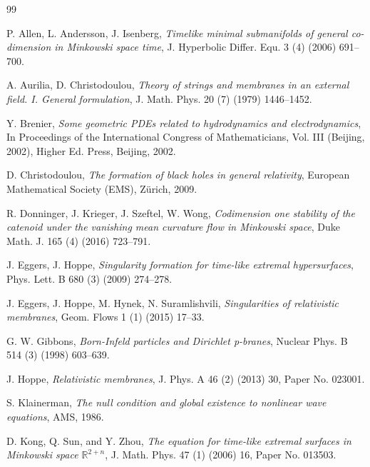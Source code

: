 \documentclass[10pt,leqno]{amsart}
\numberwithin{equation}{section}
\begin{document}
\begin{thebibliography}{99}

  P. Allen, L. Andersson, J. Isenberg, \textit{Timelike minimal submanifolds of general co-dimension in Minkowski space time},
  J. Hyperbolic Differ. Equ. 3 (4) (2006) 691–700.
  
A. Aurilia, D. Christodoulou, \textit{Theory of strings and membranes in an external field. I. General formulation},
J. Math. Phys. 20 (7) (1979) 1446–1452.

Y. Brenier,
\textit{Some geometric PDEs related to hydrodynamics and electrodynamics}, In
Proceedings of the International Congress of Mathematicians, Vol. III (Beijing, 2002), Higher Ed. Press, Beijing, 2002.
  
  
D. Christodoulou,
\textit{The formation of black holes in general relativity}, European Mathematical Society (EMS), Z{\"u}rich, 2009.
  


R. Donninger, J. Krieger, J. Szeftel, W. Wong,
\textit{Codimension one
	stability of the catenoid under the vanishing mean curvature flow in Minkowski space}, Duke Math. J. 165 (4) (2016) 723–791.
	
	
J. Eggers, J. Hoppe,
\textit{Singularity formation for time-like extremal hypersurfaces}, Phys. Lett. B 680 (3) (2009) 274–278.


J. Eggers, J. Hoppe, M. Hynek, N. Suramlishvili,
\textit{Singularities of relativistic membranes}, Geom. Flows 1 (1) (2015) 17–33.


G. W. Gibbons,
\textit{Born-Infeld particles and Dirichlet p-branes}, Nuclear Phys. B 514 (3) (1998) 603–639.

  



J. Hoppe,
\textit{Relativistic membranes}, J. Phys. A 46 (2) (2013) 30, Paper No. 023001.


S. Klainerman,
\textit{The null condition and global existence to nonlinear wave equations}, AMS, 1986.


  
D. Kong, Q. Sun, and Y. Zhou,
\textit{The equation for time-like extremal surfaces in Minkowski space $\mathbb{R}^{2+n}$}, J. Math. Phys. 47 (1) (2006) 16, Paper No. 013503.



\end{thebibliography}
\end{document}
